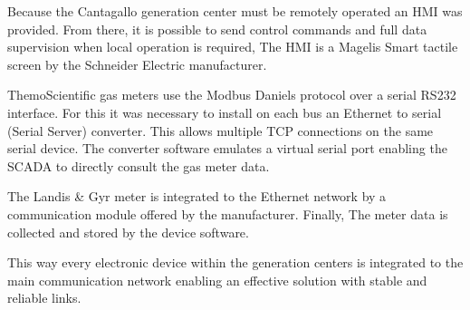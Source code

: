 Because the Cantagallo generation center must be remotely operated
an HMI was provided. From there, it is possible to send control
commands and full data supervision when local operation is required,
The HMI is a Magelis Smart tactile screen by the Schneider Electric 
manufacturer.

ThemoScientific gas meters use the Modbus Daniels protocol over a
serial RS232 interface. For this it was necessary to install on each
bus an Ethernet to serial (Serial Server) converter. This allows
multiple TCP connections on the same serial device. The converter
software emulates a virtual serial port enabling the SCADA to directly
consult the gas meter data.

The Landis \& Gyr meter is integrated to the Ethernet network by a
communication module offered by the manufacturer. Finally, The meter
data is collected and stored by the device software.

This way every electronic device within the generation centers is
integrated to the main communication network enabling an effective
solution with stable and reliable links.

